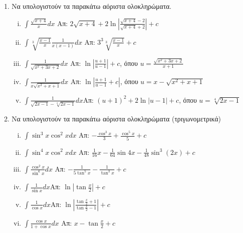 \begin{enumerate}
  \item \label{ask:rizes} Να υπολογιστούν τα παρακάτω αόριστα ολοκληρώματα.
    \begin{enumerate}[i)]
      \item $\int\frac{\sqrt{x+4}}{x}dx$
        \hfill Απ: $2\sqrt{x+4}+2\ln\left|\frac{\sqrt{x+4}-2}{\sqrt{x+4}+2}\right|+c$
      \item $\int\sqrt[3]{\frac{x-1}{x}}\frac{1}{x(x-1)}dx$
        \hfill Απ: $3^3\sqrt[3]{\frac{x-1}{x}} +c$
      \item $\int\frac{1}{\sqrt{x^2+3x+2}}dx$
        \hfill Απ: $\ln\left|\frac{u+1}{u-1}\right|+c$, όπου 
        $u=\frac{\sqrt{x^2+3x+2}}{x+1}$
      \item  $\int\frac{1}{x\sqrt{x^2+x+1}}dx$
        \hfill Απ: $\ln\left|\frac{u+1}{u-1}+c\right|$, 
        όπου $u=x-\sqrt{x^2+x+1}$ 
      \item  $\int\frac{1}{\sqrt{2x-1}-\sqrt[4]{2x-1}}dx$\hfill Απ: $(u+1)^2
        +2\ln|u-1|+c$, όπου $u=\sqrt[4]{2x-1} \label{four} $
    \end{enumerate}

  \item\label{ask:trig} Να υπολογιστούν τα παρακάτω αόριστα ολοκληρώματα 
    (τριγωνομετρικά)
    \begin{enumerate}[i)]
      \item $\int\sin^3x\cos^2xdx$
        \hfill Απ: $-\frac{\cos^3x}{3}+\frac{\cos^5x}{5}+c$
      \item $\int\sin^4x\cos^2xdx$
        \hfill Απ: $\frac{1}{16}x-\frac{1}{64}\sin 4x-\frac{1}{48}\sin^3{(2x)+c}$
      \item $\int\frac{\cos^2x}{\sin^6x}dx$
        \hfill Απ: $-\frac{1}{5\tan^5x}-\frac{1}{\tan^3x}+c$
      \item $\int\frac{1}{\sin x}dx$\hfill Απ:
        $\ln\left|\tan\frac{x}{2}\right|+c$
      \item $\int\frac{1}{\cos x}dx$\hfill Απ:
        $\ln\left|\frac{\tan\frac{x}{2}+1}{\tan\frac{x}{2}-1}\right|+c$
      \item $\int\frac{\cos x}{1+\cos x}dx$
        \hfill Απ: $x-\tan\frac{x}{2}+c$
    \end{enumerate}
\end{enumerate}


